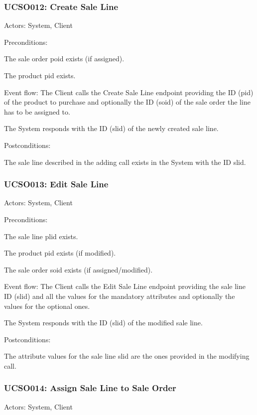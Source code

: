 \subsubsection{UCSO012: Create Sale Line}
\label{UCSO012}

Actors: System, Client

Preconditions:

\ucitem The sale order poid exists (if assigned).

\ucitem The product pid exists.

Event flow:
\ucitem The Client calls the Create Sale Line endpoint providing the ID (pid) of the product to purchase and optionally the ID (soid) of the sale order the line has to be 
assigned to.

\ucitem The System responds with the ID (slid) of the newly created sale line.

Postconditions:

\ucitem The sale line described in the adding call exists in the System with the ID slid.

\subsubsection{UCSO013: Edit Sale Line}
\label{UCSO013}

Actors: System, Client

Preconditions:

\ucitem The sale line plid exists.

\ucitem The product pid exists (if modified).

The sale order soid exists (if assigned/modified).

Event flow:
\ucitem The Client calls the Edit Sale Line endpoint providing the sale line ID (slid) and all the values for the mandatory attributes and optionally the values for the optional 
ones.

\ucitem The System responds with the ID (slid) of the modified sale line.

Postconditions:

\ucitem The attribute values for the sale line slid are the ones provided in the modifying call.

\subsubsection{UCSO014: Assign Sale Line to Sale Order}
\label{UCSO014}

Actors: System, Client


